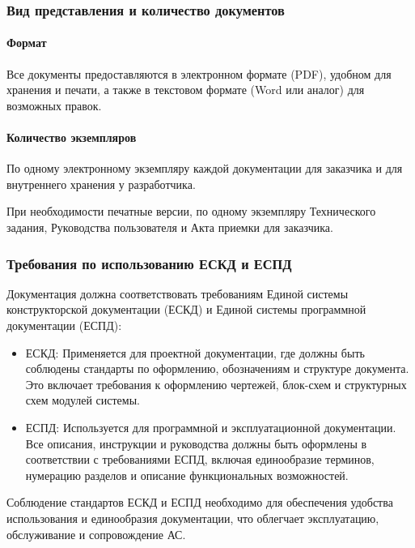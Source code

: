 \subsubsection{Вид представления и количество документов}

\paragraph{Формат}

Все документы предоставляются в электронном формате (PDF),
удобном для хранения и печати,
а также в текстовом формате (Word или аналог) для возможных правок.

\paragraph{Количество экземпляров}

По одному электронному экземпляру каждой документации
для заказчика и для внутреннего хранения у разработчика.

При необходимости печатные версии, по одному экземпляру Технического задания,
Руководства пользователя и Акта приемки для заказчика.

\subsubsection{Требования по использованию ЕСКД и ЕСПД}

Документация должна соответствовать требованиям
Единой системы конструкторской документации (ЕСКД)
и Единой системы программной документации (ЕСПД):

\begin{itemize}
	\item ЕСКД: Применяется для проектной документации,
		где должны быть соблюдены стандарты по оформлению, обозначениям
		и структуре документа.
		Это включает требования к оформлению чертежей,
		блок-схем и структурных схем модулей системы.
	\item ЕСПД: Используется для программной и эксплуатационной документации.
		Все описания, инструкции и руководства должны быть оформлены
		в соответствии с требованиями ЕСПД, включая единообразие терминов,
		нумерацию разделов и описание функциональных возможностей.
\end{itemize}

Соблюдение стандартов ЕСКД и ЕСПД необходимо
для обеспечения удобства использования и единообразия документации,
что облегчает эксплуатацию, обслуживание и сопровождение АС.

